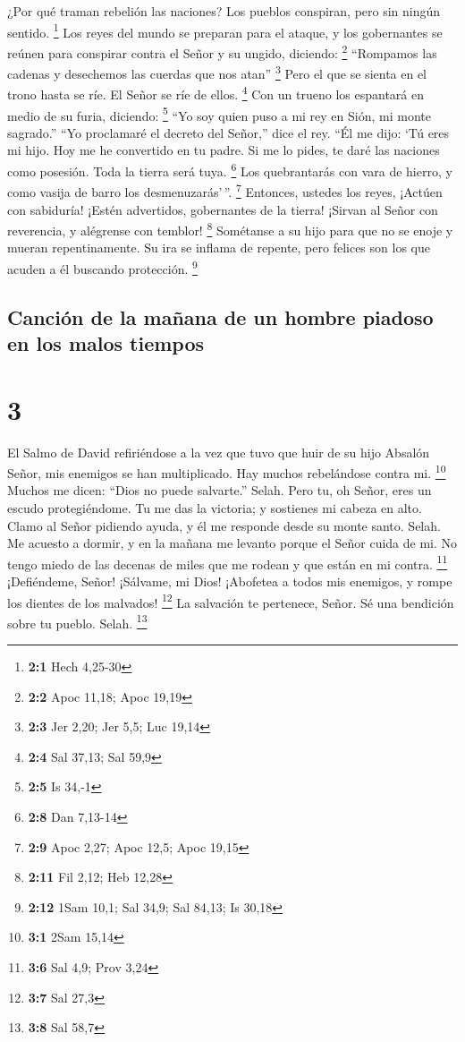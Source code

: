  ¿Por qué traman rebelión las naciones? Los pueblos
conspiran, pero sin ningún sentido. \footnote{\textbf{2:1} Hech 4,25-30}
 Los reyes del mundo se preparan para el ataque, y los
gobernantes se reúnen para conspirar contra el Señor y su ungido,
diciendo: \footnote{\textbf{2:2} Apoc 11,18; Apoc 19,19} 
``Rompamos las cadenas y desechemos las cuerdas que nos atan''
\footnote{\textbf{2:3} Jer 2,20; Jer 5,5; Luc 19,14}  Pero
el que se sienta en el trono hasta se ríe. El Señor se ríe de ellos.
\footnote{\textbf{2:4} Sal 37,13; Sal 59,9}  Con un trueno
los espantará en medio de su furia, diciendo: \footnote{\textbf{2:5} Is
  34,-1}  ``Yo soy quien puso a mi rey en Sión, mi monte
sagrado.''  ``Yo proclamaré el decreto del Señor,'' dice el
rey. ``Él me dijo: `Tú eres mi hijo. Hoy me he convertido en tu padre.
 Si me lo pides, te daré las naciones como posesión. Toda la
tierra será tuya. \footnote{\textbf{2:8} Dan 7,13-14}  Los
quebrantarás con vara de hierro, y como vasija de barro los
desmenuzarás'\,''. \footnote{\textbf{2:9} Apoc 2,27; Apoc 12,5; Apoc
  19,15}  Entonces, ustedes los reyes, ¡Actúen con
sabiduría! ¡Estén advertidos, gobernantes de la tierra! 
¡Sirvan al Señor con reverencia, y alégrense con temblor! \footnote{\textbf{2:11}
  Fil 2,12; Heb 12,28}  Sométanse a su hijo para que no se
enoje y mueran repentinamente. Su ira se inflama de repente, pero
felices son los que acuden a él buscando protección. \footnote{\textbf{2:12}
  1Sam 10,1; Sal 34,9; Sal 84,13; Is 30,18}

\hypertarget{canciuxf3n-de-la-mauxf1ana-de-un-hombre-piadoso-en-los-malos-tiempos}{%
\subsection{Canción de la mañana de un hombre piadoso en los malos
tiempos}\label{canciuxf3n-de-la-mauxf1ana-de-un-hombre-piadoso-en-los-malos-tiempos}}

\hypertarget{section-2}{%
\section{3}\label{section-2}}

El Salmo de David refiriéndose a la vez que tuvo que huir de su hijo
Absalón  Señor, mis enemigos se han multiplicado. Hay muchos
rebelándose contra mi. \footnote{\textbf{3:1} 2Sam 15,14} 
Muchos me dicen: ``Dios no puede salvarte.'' Selah.  Pero
tu, oh Señor, eres un escudo protegiéndome. Tu me das la victoria; y
sostienes mi cabeza en alto.  Clamo al Señor pidiendo ayuda,
y él me responde desde su monte santo. Selah.  Me acuesto a
dormir, y en la mañana me levanto porque el Señor cuida de mi.
 No tengo miedo de las decenas de miles que me rodean y que
están en mi contra. \footnote{\textbf{3:6} Sal 4,9; Prov 3,24}
 ¡Defiéndeme, Señor! ¡Sálvame, mi Dios! ¡Abofetea a todos
mis enemigos, y rompe los dientes de los malvados! \footnote{\textbf{3:7}
  Sal 27,3}  La salvación te pertenece, Señor. Sé una
bendición sobre tu pueblo. Selah. \footnote{\textbf{3:8} Sal 58,7}

